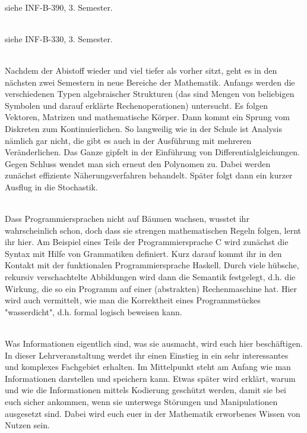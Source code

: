 \textbf{} \\
siehe INF-B-390, 3. Semester.

\textbf{} \\
siehe INF-B-330, 3. Semester.

\hline

\textbf{} \\
Nachdem der Abistoff wieder und viel tiefer als vorher sitzt, geht es in den nächsten zwei Semestern in neue Bereiche der Mathematik.
Anfangs werden die verschiedenen Typen algebraischer Strukturen (das sind Mengen von beliebigen Symbolen und darauf erklärte Rechenoperationen) untersucht.
Es folgen Vektoren, Matrizen und mathematische Körper.
Dann kommt ein Sprung vom Diskreten zum Kontinuierlichen.
So langweilig wie in der Schule ist Analysis nämlich gar nicht, die gibt es auch in der Ausführung mit mehreren Veränderlichen.
Das Ganze gipfelt in der Einführung von Differentialgleichungen.
Gegen Schluss wendet man sich erneut den Polynomen zu.
Dabei werden zunächst effiziente Näherungsverfahren behandelt.
Später folgt dann ein kurzer Ausflug in die Stochastik.

\textbf{} \\
Dass Programmiersprachen nicht auf Bäumen wachsen, wusstet ihr wahrscheinlich schon, doch dass sie strengen mathematischen Regeln folgen, lernt ihr hier.
Am Beispiel eines Teils der Programmiersprache C wird zunächst die Syntax mit Hilfe von Grammatiken definiert.
Kurz darauf kommt ihr in den Kontakt mit der funktionalen Programmiersprache Haskell.
Durch viele hübsche, rekursiv verschachtelte Abbildungen wird dann die Semantik festgelegt, d.h. die Wirkung, die so ein Programm auf einer (abstrakten) Rechenmaschine hat.
Hier wird auch vermittelt, wie man die Korrektheit eines Programmstückes "wasserdicht", d.h. formal logisch beweisen kann.

\textbf{} \\
Was Informationen eigentlich sind, was sie ausmacht, wird euch hier beschäftigen.
In dieser Lehrveranstaltung werdet ihr einen Einstieg in ein sehr interessantes und komplexes Fachgebiet erhalten.
Im Mittelpunkt steht am Anfang wie man Informationen darstellen und speichern kann.
Etwas später wird erklärt, warum und wie die Informationen mittels Kodierung geschützt werden, damit sie bei euch sicher ankommen, wenn sie unterwegs Störungen und Manipulationen ausgesetzt sind.
Dabei wird euch euer in der Mathematik erworbenes Wissen von Nutzen sein.

